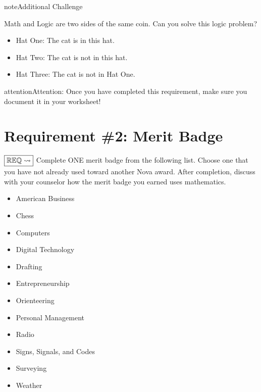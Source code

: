 \documentclass[letterpaper,10pt,english,openany,oneside]{sphinxmanual}
\begin{document}
\begin{sphinxadmonition}{note}{Additional Challenge}

Math and Logic are two sides of the same coin. Can you solve this logic problem?

\begin{itemize}
\item {} 
Hat One: The cat is in this hat.

\item {} 
Hat Two: The cat is not in this hat.

\item {} 
Hat Three: The cat is not in Hat One.

\end{itemize}


\end{sphinxadmonition}

\begin{sphinxadmonition}{attention}{Attention:}
Once you have completed this requirement, make sure you document it in your worksheet!
\end{sphinxadmonition}


\chapter{Requirement \#2: Merit Badge}
\label{\detokenize{requirement2:requirement-2-merit-badge}}\label{\detokenize{requirement2::doc}}
\(\boxed{\mathbb{REQ}\Large \rightsquigarrow}\) Complete ONE merit badge from the following list. Choose one that you have not already used toward another Nova award.
After completion, discuss with your counselor how the merit badge you earned uses mathematics.
\begin{itemize}
\item {} 
American Business

\item {} 
Chess

\item {} 
Computers

\item {} 
Digital Technology

\item {} 
Drafting

\item {} 
Entrepreneurship

\item {} 
Orienteering

\item {} 
Personal Management

\item {} 
Radio

\item {} 
Signs, Signals, and Codes

\item {} 
Surveying

\item {} 
Weather

\end{itemize}
\end{document}

